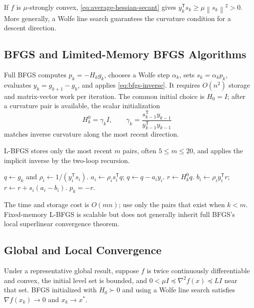 \documentclass[12pt,oneside]{book}
\numberwithin{equation}{section}
\theoremstyle{definition}
\theoremstyle{plain}
\theoremstyle{remark}
\newcommand{\norm}[1]{\left\lVert #1 \right\rVert}
\newcommand{\grad}{\nabla}
\newcommand{\Hess}{\nabla^2}
\begin{document}
If $f$ is $\mu$-strongly convex, \cref{eq:average-hessian-secant} gives
$y_k^\mathsf Ts_k\geq\mu\norm{s_k}^2>0$. More generally, a Wolfe line search
guarantees the curvature condition for a descent direction.

\subsection{BFGS and Limited-Memory BFGS Algorithms}

Full BFGS computes $p_k=-H_kg_k$, chooses a Wolfe step $\alpha_k$, sets
$s_k=\alpha_kp_k$, evaluates $y_k=g_{k+1}-g_k$, and applies
\cref{eq:bfgs-inverse}. It requires $O(n^2)$ storage and matrix-vector work per
iteration. The common initial choice is $H_0=I$; after a curvature pair is
available, the scalar initialization
\[
 H_k^0=\gamma_kI,
 \qquad
 \gamma_k=\frac{s_{k-1}^\mathsf Ty_{k-1}}
 {y_{k-1}^\mathsf Ty_{k-1}}
\]
matches inverse curvature along the most recent direction.

L-BFGS stores only the most recent $m$ pairs, often $5\leq m\leq20$, and
applies the implicit inverse by the two-loop recursion.

\begin{algorithm}[H]
\caption{L-BFGS two-loop recursion for $p_k=-H_kg_k$}
\begin{algorithmic}[1]
\State $q\gets g_k$ and $\rho_i\gets1/(y_i^\mathsf Ts_i)$.
  \State $a_i\gets\rho_i s_i^\mathsf Tq$; $q\gets q-a_iy_i$.
\EndFor
\State $r\gets H_k^0q$.
  \State $b_i\gets\rho_i y_i^\mathsf Tr$; $r\gets r+s_i(a_i-b_i)$.
\EndFor
\State \Return $p_k=-r$.
\end{algorithmic}
\end{algorithm}

The time and storage cost is $O(mn)$; use only the pairs that exist when
$k<m$. Fixed-memory L-BFGS is scalable but does not generally inherit full
BFGS's local superlinear convergence theorem.

\subsection{Global and Local Convergence}

Under a representative global result, suppose $f$ is twice continuously
differentiable and convex, the initial level set is bounded, and
$0<\mu I\preceq\Hess f(x)\preceq LI$ near that set. BFGS initialized with
$H_0\succ0$ and using a Wolfe line search satisfies
$\grad f(x_k)\to0$ and $x_k\to x^*$.
\end{document}
